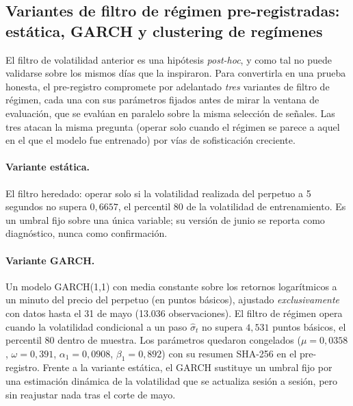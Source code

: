 \subsection{Variantes de filtro de régimen pre-registradas: estática, GARCH y clustering de regímenes}
\label{sec::variantes_gate}

El filtro de volatilidad anterior es una hipótesis \emph{post-hoc}, y como tal no puede
validarse sobre los mismos días que la inspiraron. Para convertirla en una prueba honesta,
el pre-registro compromete por adelantado \emph{tres} variantes de filtro de régimen,
cada una con sus parámetros fijados antes de mirar la ventana de evaluación, que se
evalúan en paralelo sobre la misma selección de señales. Las tres atacan la misma pregunta
(operar solo cuando el régimen se parece a aquel en el que el modelo fue entrenado) por
vías de sofisticación creciente.

\paragraph{Variante estática.} El filtro heredado: operar solo si la volatilidad realizada
del perpetuo a 5 segundos no supera $0{,}6657$, el percentil 80 de la volatilidad de
entrenamiento. Es un umbral fijo sobre una única variable; su versión de junio se reporta
como diagnóstico, nunca como confirmación.

\paragraph{Variante GARCH.} Un modelo GARCH(1,1) con media constante sobre los retornos
logarítmicos a un minuto del precio del perpetuo (en puntos básicos), ajustado
\emph{exclusivamente} con datos hasta el 31 de mayo (13.036 observaciones). El filtro de régimen
opera cuando la volatilidad condicional a un paso $\hat{\sigma}_t$ no supera $4{,}531$
puntos básicos, el percentil 80 dentro de muestra. Los parámetros quedaron congelados
($\mu=0{,}0358$, $\omega=0{,}391$, $\alpha_1=0{,}0908$, $\beta_1=0{,}892$) con su resumen
SHA-256 en el pre-registro. Frente a la variante estática, el GARCH sustituye un umbral fijo por
una estimación dinámica de la volatilidad que se actualiza sesión a sesión, pero sin
reajustar nada tras el corte de mayo.

